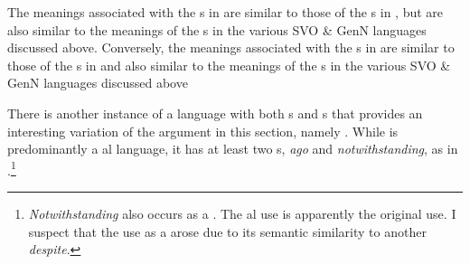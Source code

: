 \documentclass[output=paper]{langsci/langscibook}
\begin{document}
\begin{table}
\caption{Prepositions and postpositions of Kanuri }
\label{extab:dryer:35}
\end{table}

\noindent The meanings associated with the s in  are similar to those of the s in , but are also similar to the meanings of the s in the various SVO \& GenN languages discussed above. Conversely, the meanings associated with the s in  are similar to those of the s in  and also similar to the meanings of the s in the various SVO \& GenN languages discussed above

There is another instance of a language with both s and s that provides an interesting variation of the argument in this section, namely . While  is predominantly a al language, it has at least two s, \textit{ago} and \textit{notwithstanding}, as in .\footnote{\textit{Notwithstanding} also occurs as a . The al use is apparently the original use. I suspect that the use as a  arose due to its semantic similarity to another  \textit{despite}.}
\end{document}

